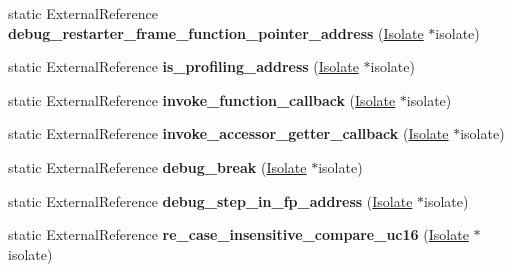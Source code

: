\begin{DoxyCompactItemize}
\item 
\hypertarget{classv8_1_1internal_1_1_b_a_s_e___e_m_b_e_d_d_e_d_afda2dbbaf1c8637f8002b804dcf5faf5}{}static External\+Reference {\bfseries debug\+\_\+restarter\+\_\+frame\+\_\+function\+\_\+pointer\+\_\+address} (\hyperlink{classv8_1_1internal_1_1_isolate}{Isolate} $\ast$isolate)\label{classv8_1_1internal_1_1_b_a_s_e___e_m_b_e_d_d_e_d_afda2dbbaf1c8637f8002b804dcf5faf5}

\item 
\hypertarget{classv8_1_1internal_1_1_b_a_s_e___e_m_b_e_d_d_e_d_a537c787af232dd7f6682a6a2af894610}{}static External\+Reference {\bfseries is\+\_\+profiling\+\_\+address} (\hyperlink{classv8_1_1internal_1_1_isolate}{Isolate} $\ast$isolate)\label{classv8_1_1internal_1_1_b_a_s_e___e_m_b_e_d_d_e_d_a537c787af232dd7f6682a6a2af894610}

\item 
\hypertarget{classv8_1_1internal_1_1_b_a_s_e___e_m_b_e_d_d_e_d_a82bb29e1b2ddf06dae44016c5eb98f09}{}static External\+Reference {\bfseries invoke\+\_\+function\+\_\+callback} (\hyperlink{classv8_1_1internal_1_1_isolate}{Isolate} $\ast$isolate)\label{classv8_1_1internal_1_1_b_a_s_e___e_m_b_e_d_d_e_d_a82bb29e1b2ddf06dae44016c5eb98f09}

\item 
\hypertarget{classv8_1_1internal_1_1_b_a_s_e___e_m_b_e_d_d_e_d_a2f4f8fce7dacf3a3061f037daa258719}{}static External\+Reference {\bfseries invoke\+\_\+accessor\+\_\+getter\+\_\+callback} (\hyperlink{classv8_1_1internal_1_1_isolate}{Isolate} $\ast$isolate)\label{classv8_1_1internal_1_1_b_a_s_e___e_m_b_e_d_d_e_d_a2f4f8fce7dacf3a3061f037daa258719}

\item 
\hypertarget{classv8_1_1internal_1_1_b_a_s_e___e_m_b_e_d_d_e_d_a12fbf4516f1e815e0a2e859115b36240}{}static External\+Reference {\bfseries debug\+\_\+break} (\hyperlink{classv8_1_1internal_1_1_isolate}{Isolate} $\ast$isolate)\label{classv8_1_1internal_1_1_b_a_s_e___e_m_b_e_d_d_e_d_a12fbf4516f1e815e0a2e859115b36240}

\item 
\hypertarget{classv8_1_1internal_1_1_b_a_s_e___e_m_b_e_d_d_e_d_a263d319c78a9dbbbb13d42374cf21647}{}static External\+Reference {\bfseries debug\+\_\+step\+\_\+in\+\_\+fp\+\_\+address} (\hyperlink{classv8_1_1internal_1_1_isolate}{Isolate} $\ast$isolate)\label{classv8_1_1internal_1_1_b_a_s_e___e_m_b_e_d_d_e_d_a263d319c78a9dbbbb13d42374cf21647}

\item 
\hypertarget{classv8_1_1internal_1_1_b_a_s_e___e_m_b_e_d_d_e_d_acec61db6a0261a315a02978e9255ea2f}{}static External\+Reference {\bfseries re\+\_\+case\+\_\+insensitive\+\_\+compare\+\_\+uc16} (\hyperlink{classv8_1_1internal_1_1_isolate}{Isolate} $\ast$isolate)\label{classv8_1_1internal_1_1_b_a_s_e___e_m_b_e_d_d_e_d_acec61db6a0261a315a02978e9255ea2f}


\end{DoxyCompactItemize}
